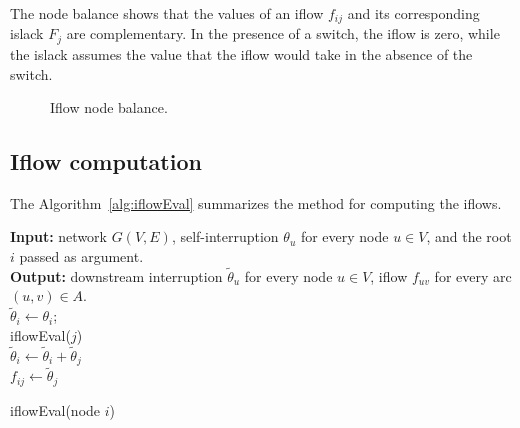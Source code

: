 \documentclass{article}
\begin{document}
The node balance shows that the values of an iflow $f_{ij}$ and its corresponding islack $F_j$ are complementary. In the presence of a switch, the iflow is zero, while the islack assumes the value that the iflow would take in the absence of the switch.

\begin{figure}[hbtp]
	\begin{center}
	\end{center}
\caption{Iflow node balance.}
\label{fig:balance}
\end{figure}

\subsection{Iflow computation}


The Algorithm~\ref{alg:iflowEval} summarizes the method for computing the iflows. 

\begin{algorithm}[H]
\textbf{Input:} network $G(V,E)$, self-interruption $\theta_u$ for every node $u \in V$, and the root $i$ passed as argument. \\
\textbf{Output:} downstream interruption $\tilde{\theta}_u$ for every node $u \in V$, iflow $f_{uv}$ for every arc $(u,v) \in A$. \\
\Begin
{
    $\tilde{\theta}_i \leftarrow \theta_i$; \\
	{
	    iflowEval($j$) \\
	    {
	        $\tilde{\theta}_i \leftarrow \tilde{\theta}_i + \tilde{\theta}_j$ \\
	        $f_{ij} \leftarrow \tilde{\theta}_j$
	    }
	}
}
\caption{iflowEval(node $i$)}
\label{alg:iflowEval}
\end{algorithm}
\end{document}

